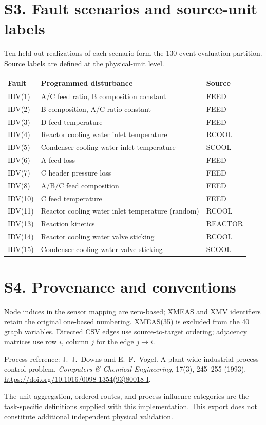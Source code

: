 \documentclass[11pt,a4paper]{article}
\begin{document}
\section*{S3. Fault scenarios and source-unit labels}
Ten held-out realizations of each scenario form the 130-event evaluation partition. Source labels are defined at the physical-unit level.
\begin{longtable}{lp{10cm}l}\toprule Fault & Programmed disturbance & Source \\\midrule\endhead
IDV(1) & A/C feed ratio, B composition constant & FEED \\
IDV(2) & B composition, A/C ratio constant & FEED \\
IDV(3) & D feed temperature & FEED \\
IDV(4) & Reactor cooling water inlet temperature & RCOOL \\
IDV(5) & Condenser cooling water inlet temperature & SCOOL \\
IDV(6) & A feed loss & FEED \\
IDV(7) & C header pressure loss & FEED \\
IDV(8) & A/B/C feed composition & FEED \\
IDV(10) & C feed temperature & FEED \\
IDV(11) & Reactor cooling water inlet temperature (random) & RCOOL \\
IDV(13) & Reaction kinetics & REACTOR \\
IDV(14) & Reactor cooling water valve sticking & RCOOL \\
IDV(15) & Condenser cooling water valve sticking & SCOOL \\
\bottomrule\end{longtable}
\section*{S4. Provenance and conventions}
Node indices in the sensor mapping are zero-based; XMEAS and XMV identifiers retain the original one-based numbering. XMEAS(35) is excluded from the 40 graph variables. Directed CSV edges use source-to-target ordering; adjacency matrices use row $i$, column $j$ for the edge $j\to i$.

Process reference: J.~J.~Downs and E.~F.~Vogel. A plant-wide industrial process control problem. \emph{Computers \& Chemical Engineering}, 17(3), 245--255 (1993). \url{https://doi.org/10.1016/0098-1354(93)80018-I}.

The unit aggregation, ordered routes, and process-influence categories are the task-specific definitions supplied with this implementation. This export does not constitute additional independent physical validation.
\end{document}
